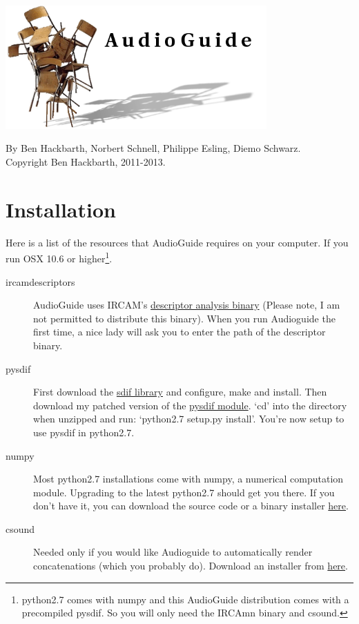 \documentclass{article}
\newcommand{\figurewrap}[2]{\begin{figure}[h!]
\centering
\texttt{[image: \#1]}
\end{figure}}
\begin{document}
\setlength{\parskip}{10pt}
\begin{spacing}{1.2}
\begin{center}
\includegraphics[width=0.75\textwidth]{image0.png}

By Ben Hackbarth, Norbert Schnell, Philippe Esling, Diemo Schwarz. \\
Copyright Ben Hackbarth, 2011-2013.
\end{center}

\tableofcontents


\section{Installation}
Here is a list of the resources that AudioGuide requires on your computer.  If you run OSX 10.6 or higher\footnote{python2.7 comes with numpy and this AudioGuide distribution comes with a precompiled pysdif.  So you will only need the IRCAmn binary and csound.}.
\begin{description}
\item[ircamdescriptors] AudioGuide uses IRCAM's \href{http://www.ircam.fr/1041.html?&L=1}{descriptor analysis binary} (Please note, I am not permitted to distribute this binary).  When you run Audioguide the first time, a nice lady will ask you to enter the path of the descriptor binary.
\item[pysdif] First download the \href{http://sourceforge.net/projects/sdif/files/sdif/}{sdif library} and configure, make and install.  Then download my patched version of the \href{http://crca.ucsd.edu/\textasciitilde ben/audioGuide/pysdif-0.1.4-patch.zip}{pysdif module}.  `cd' into the directory when unzipped and run: `python2.7 setup.py install'.  You're now setup to use pysdif in python2.7.
\item[numpy] Most python2.7 installations come with numpy, a numerical computation module.  Upgrading to the latest python2.7 should get you there.  If you don't have it, you can download the source code or a binary installer \href{http://www.scipy.org/install.html}{here}.
\item[csound] Needed only if you would like Audioguide to automatically render concatenations (which you probably do).  Download an installer from \href{http://www.csounds.com/downloads}{here}.


\end{description}
\end{spacing}
\end{document}
